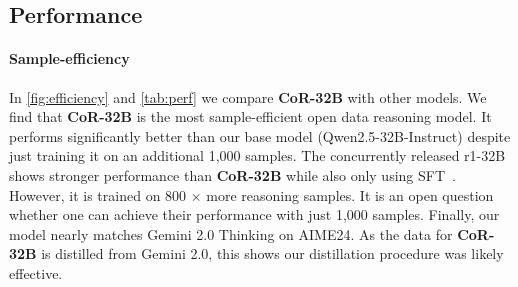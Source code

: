 \documentclass{article}
\theoremstyle{plain}
\theoremstyle{definition}
\theoremstyle{remark}
\newcommand{\model}{\textbf{CoR-32B}}
\begin{document}
\subsection{Performance}


\paragraph{Sample-efficiency} In \autoref{fig:efficiency} and \autoref{tab:perf} we compare \model{} with other models. We find that \model{} is the most sample-efficient open data reasoning model. It performs significantly better than our base model (Qwen2.5-32B-Instruct) despite just training it on an additional 1,000 samples. The concurrently released r1-32B shows stronger performance than \model{} while also only using SFT~\citep{r1}. However, it is trained on 800 $\times$ more reasoning samples. It is an open question whether one can achieve their performance with just 1,000 samples. Finally, our model nearly matches Gemini 2.0 Thinking on AIME24. As the data for \model{} is distilled from Gemini 2.0, this shows our distillation procedure was likely effective. 
\end{document}
